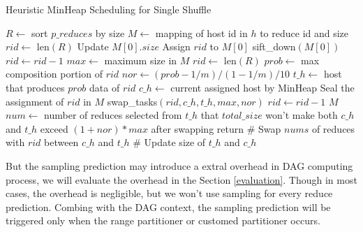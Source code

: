 \documentclass[10pt,twocolumn]{article}
\begin{document}
\begin{minipage}{\linewidth}
\begin{algorithm}[H]
\caption{Heuristic MinHeap Scheduling for Single Shuffle}
\label{hminheap}
	\begin{algorithmic}[1]
	\small
		\State $R\gets$ sort $p\_reduces$ by size
		\State $M\gets$ mapping of host id in $h$ to reduce id and size
		\State $rid\gets$ len$\left(R\right)$
		\State Update $M\left[0\right].size$
		\State Assign $rid$ to $M\left[0\right]$
		\State sift\_down$\left(M\left[0\right]\right)$
		\State
		\State $rid\gets rid-1$
		\EndWhile
		\State $max\gets$ maximum size in $M$
		\State $rid\gets$ len$\left(R\right)$
		\State $prob\gets$ max composition portion of $rid$
		\State $nor\gets \left(prob-1/m\right)/\left(1-1/m\right)/10$
		\State
		\State $t\_h\gets$ host that produces $prob$ data of $rid$
		\State $c\_h\gets$ current assigned host by MinHeap
			\State Seal the assignment of $rid$ in $M$
		\Else
			\State swap\_tasks$\left(rid, c\_h, t\_h, max, nor\right)$
		\EndIf
		\State $rid\gets rid-1$
		\EndWhile
		\Return $M$
	\EndProcedure
	\State $num\gets$ number of reduces 
	\State selected from $t\_h$ that $total\_size$ won't
	\State make both $c\_h$ and $t\_h$ exceed $\left(1+nor\right)*max$
	\State after swapping
		\State return
	\Else
		\State \# Swap $nums$ of reduces with $rid$ between $c\_h$ and $t\_h$
		\State \# Update size of $t\_h$ and $c\_h$
	\EndIf
	\EndProcedure
	\end{algorithmic}
\end{algorithm}
\end{minipage}

But the sampling prediction may introduce a extral overhead in DAG computing process, we will evaluate the overhead in the Section \ref{evaluation}. Though in most cases, the overhead is negligible, but we won't use sampling for every reduce prediction. Combing with the DAG context, the sampling prediction will be triggered only when the range partitioner or customed partitioner occurs.
\end{document}
